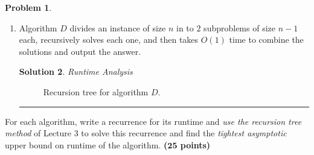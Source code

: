 \documentclass{article}
\theoremstyle{definition}
\newtheorem{problem}{Problem}
\def\fline{\rule{0.75\linewidth}{0.5pt}}
\newcommand{\finishline}{\begin{center}\fline\end{center}}
\newtheorem*{solution*}{Solution}
\newenvironment{solution}{\begin{solution*}}{{\finishline} \end{solution*}}
\newcommand{\grade}[1]{\hfill{\textbf{($\mathbf{#1}$ points)}}}
\begin{document}
\begin{problem}
\begin{enumerate}[label=(\Alph*)]
		    \begin{solution}
			
			\emph{Runtime Analysis}
	
		\begin{figure}[h!]
			\centering
			\caption{Recursion tree for algorithm $C$.} 
		\end{figure}
\end{solution}

		\item Algorithm $D$ divides an instance of size $n$ in to $2$ subproblems of size $n-1$ each, recursively solves each one, and then takes $O(1)$ time to combine the solutions and output the answer. 
		
		    \begin{solution}

			\emph{Runtime Analysis}
	
		\begin{figure}[h!]
			\centering
			\caption{Recursion tree for algorithm $D$.} 
		\end{figure}
\end{solution}

	\end{enumerate}
	
	For each algorithm, write a recurrence for its runtime and \emph{use the recursion tree method} of Lecture 3 to solve this recurrence and find the \emph{tightest asymptotic} upper bound on runtime of the algorithm. \grade{25} 
\end{problem}
\end{document}
